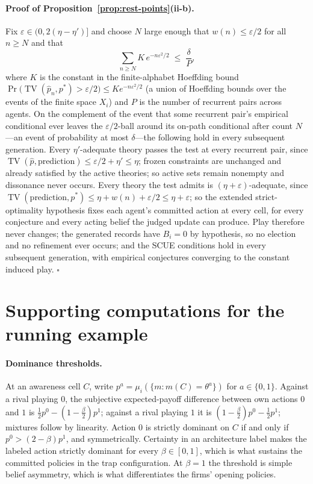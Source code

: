 \documentclass[11pt]{article}
\theoremstyle{definition}
\newcommand{\TV}{\operatorname{TV}}
\begin{document}
\paragraph{Proof of Proposition~\ref{prop:rest-points}(ii-b).}
Fix $\varepsilon\in(0,2(\eta-\eta')]$ and choose $N$ large enough that
$w(n)\leq\varepsilon/2$ for all $n\geq N$ and that
\[
\sum_{n\geq N}K\,e^{-n\varepsilon^{2}/2}\;\leq\;\frac{\delta}{P},
\]
where $K$ is the constant in the finite-alphabet Hoeffding bound
$\Pr\bigl(\TV(\hat p_n,p^{*})>\varepsilon/2\bigr)\leq K e^{-n\varepsilon^{2}/2}$
(a union of Hoeffding bounds over the events of the finite space $X_i$) and
$P$ is the number of recurrent pairs across agents.  On the complement of
the event that some recurrent pair's empirical conditional ever leaves the
$\varepsilon/2$-ball around its on-path conditional after count $N$---an
event of probability at most $\delta$---the following hold in every
subsequent generation.  Every $\eta'$-adequate theory passes the test at
every recurrent pair, since
$\TV(\hat p,\text{prediction})\leq\varepsilon/2+\eta'\leq\eta$; frozen
constraints are unchanged and already satisfied by the active theories; so
active sets remain nonempty and dissonance never occurs.  Every theory the
test admits is $(\eta+\varepsilon)$-adequate, since
$\TV(\text{prediction},p^{*})\leq\eta+w(n)+\varepsilon/2\leq\eta+\varepsilon$;
so the extended strict-optimality hypothesis fixes each agent's committed
action at every cell, for every conjecture and every acting belief the
judged update can produce.  Play therefore never changes; the generated
records have $B_i=0$ by hypothesis, so no election and no refinement ever
occurs; and the SCUE conditions hold in every subsequent generation, with
empirical conjectures converging to the constant induced play.
\hfill$\square$

\section{Supporting computations for the running example}
\label{app:example}

\paragraph{Dominance thresholds.}
At an awareness cell $C$, write $p^a=\mu_i(\{m:m(C)=\theta^a\})$ for
$a\in\{0,1\}$.  Against a rival playing $0$, the subjective expected-payoff
difference between own actions $0$ and $1$ is
$\tfrac12p^0-(1-\tfrac{\beta}{2})p^1$; against a rival playing $1$ it is
$(1-\tfrac{\beta}{2})p^0-\tfrac12p^1$; mixtures follow by linearity.  Action
$0$ is strictly dominant on $C$ if and only if $p^0>(2-\beta)p^1$, and
symmetrically.  Certainty in an architecture label makes the labeled action
strictly dominant for every $\beta\in[0,1]$, which is what sustains the
committed policies in the trap configuration.  At $\beta=1$ the threshold is
simple belief asymmetry, which is what differentiates the firms' opening
policies.
\end{document}
